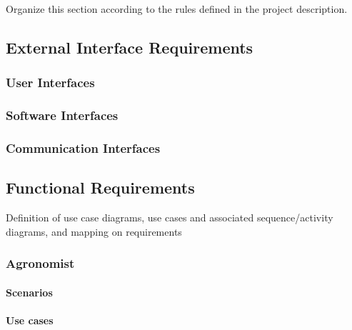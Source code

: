 Organize this section according to the rules defined in the project description. 
\subsection{External Interface Requirements}
\subsubsection{User Interfaces}
\subsubsection{Software Interfaces}
\subsubsection{Communication Interfaces}
\subsection{Functional Requirements}
Definition of use case diagrams, use cases and associated sequence/activity diagrams, and mapping on requirements

\setcounter{usecase_counter}{1}

%
%
%




\subsubsection{Agronomist}
\paragraph{Scenarios}


\paragraph{Use cases}







